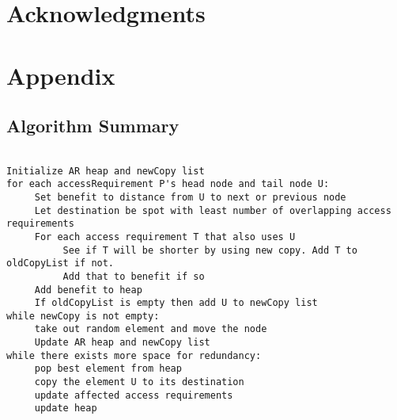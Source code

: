 \documentclass[11pt,psfig]{article}
\begin{document}
\section*{Acknowledgments}

\newpage




\newpage

\section*{Appendix}

\subsection*{Algorithm Summary}

\begin{verbatim}

Initialize AR heap and newCopy list
for each accessRequirement P's head node and tail node U:
     Set benefit to distance from U to next or previous node
     Let destination be spot with least number of overlapping access requirements
     For each access requirement T that also uses U
          See if T will be shorter by using new copy. Add T to oldCopyList if not.
          Add that to benefit if so
     Add benefit to heap
     If oldCopyList is empty then add U to newCopy list
while newCopy is not empty:
     take out random element and move the node
     Update AR heap and newCopy list
while there exists more space for redundancy:
     pop best element from heap
     copy the element U to its destination
     update affected access requirements
     update heap

\end{verbatim}
 

\end{document}
